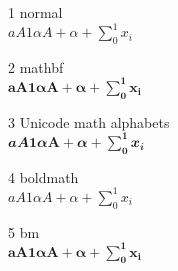 \documentclass{article}
\begin{document}
1 normal\\
 $aA1αΑ+\alpha + \sum_0^1 x_i$

2 mathbf\\
 $\mathbf{aA1αΑ+\alpha + \sum_0^1 x_i}$

3 Unicode math alphabets\\
 $𝒂𝑨𝟏𝜶𝚨+𝜶 + \sum_𝟎^𝟏 𝒙_𝒊$

4 boldmath\\
 {\boldmath $aA1αΑ+\alpha + \sum_0^1 x_i$}

5 bm\\
 $\bm{aA1αΑ+\alpha + \sum_0^1 x_i}$
\end{document}

